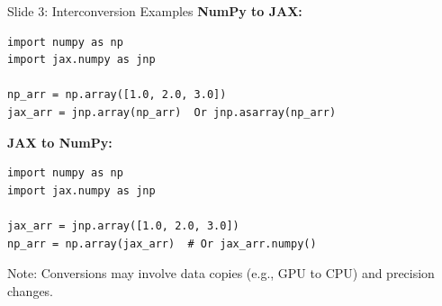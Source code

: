 \documentclass[aspectratio=169]{beamer}
\renewcommand{\footnotesize}{\fontsize{7}{8}\selectfont}
\begin{document}
\begin{frame}[t]{Slide 3: Interconversion Examples}
\footnotesize
\textbf{NumPy to JAX:}
\begin{lstlisting}
import numpy as np
import jax.numpy as jnp

np_arr = np.array([1.0, 2.0, 3.0])
jax_arr = jnp.array(np_arr)  Or jnp.asarray(np_arr)
\end{lstlisting}

\textbf{JAX to NumPy:}
\begin{lstlisting}
import numpy as np
import jax.numpy as jnp

jax_arr = jnp.array([1.0, 2.0, 3.0])
np_arr = np.array(jax_arr)  # Or jax_arr.numpy()
\end{lstlisting}

Note: Conversions may involve data copies (e.g., GPU to CPU) and precision changes.
\end{frame}
\end{document}
